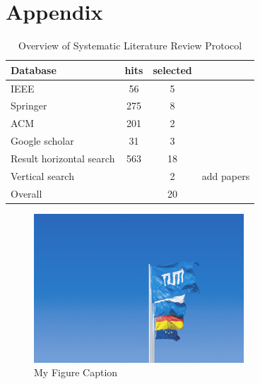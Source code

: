 \chapter{Appendix}


	\begin{table}[]
		\centering
		\caption{\centering Overview of Systematic Literature Review Protocol}
		\begin{tabular}{lccl}
    	\textbf{Database}\hspace{30mm} & \textbf{hits} & \textbf{selected} &  \\
    	\hline
		IEEE                     		& 56   & 5   &      		\\
		Springer                 		& 275  & 8   &      		\\
		ACM                      		& 201  & 2   &      		\\
		Google scholar           		& 31   & 3   &      		\\
		\hline
		Result horizontal search	 	& 563  & 18  &      		\\
		Vertical search          		&      & 2   &  \hspace{5mm}add papers  \\
		\hline
		Overall                  		&      & 20   &     
		\end{tabular}
	\end{table}

\newpage

\begin{figure}[h]
    \centering
    \caption{My Figure Caption}
    \includegraphics[width=0.7\textwidth]{tum-resources/images/Universitaet_Flaggen.jpg}
\end{figure}
